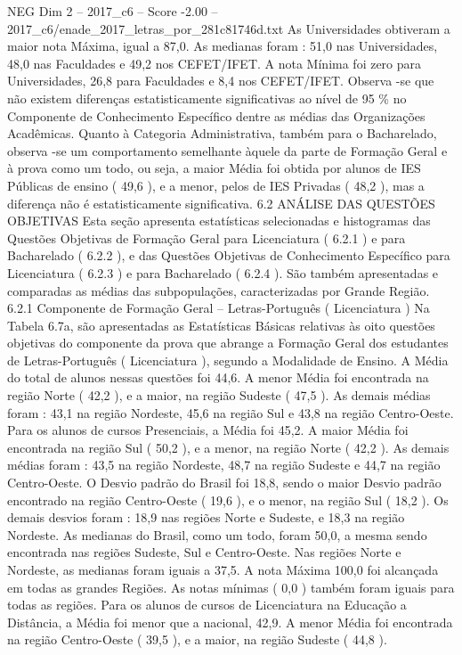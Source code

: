 \begin{textsample}{NEG Dim 2 – 2017\_c6 – Score -2.00 – 2017\_c6/enade\_2017\_letras\_por\_281c81746d.txt}
As Universidades obtiveram a maior nota Máxima, igual a 87,0.
As medianas foram : 51,0 nas Universidades, 48,0 nas Faculdades e 49,2 nos CEFET/IFET.
A nota Mínima foi zero para Universidades, 26,8 para Faculdades e 8,4 nos CEFET/IFET.
Observa -se que não existem diferenças estatisticamente significativas ao nível de 95 \% no Componente de Conhecimento Específico dentre as médias das Organizações Acadêmicas.
Quanto à Categoria Administrativa, também para o Bacharelado, observa -se um comportamento semelhante àquele da parte de Formação Geral e à prova como um todo, ou seja, a maior Média foi obtida por alunos de IES Públicas de ensino ( 49,6 ), e a menor, pelos de IES Privadas ( 48,2 ), mas a diferença não é estatisticamente significativa. 6.2 ANÁLISE DAS QUESTÕES OBJETIVAS Esta seção apresenta estatísticas selecionadas e histogramas das Questões Objetivas de Formação Geral para Licenciatura ( 6.2.1 ) e para Bacharelado ( 6.2.2 ), e das Questões Objetivas de Conhecimento Específico para Licenciatura ( 6.2.3 ) e para Bacharelado ( 6.2.4 ).
São também apresentadas e comparadas as médias das subpopulações, caracterizadas por Grande Região. 6.2.1 Componente de Formação Geral – Letras-Português ( Licenciatura ) Na Tabela 6.7a, são apresentadas as Estatísticas Básicas relativas às oito questões objetivas do componente da prova que abrange a Formação Geral dos estudantes de Letras-Português ( Licenciatura ), segundo a Modalidade de Ensino.
A Média do total de alunos nessas questões foi 44,6.
A menor Média foi encontrada na região Norte ( 42,2 ), e a maior, na região Sudeste ( 47,5 ).
As demais médias foram : 43,1 na região Nordeste, 45,6 na região Sul e 43,8 na região Centro-Oeste.
Para os alunos de cursos Presenciais, a Média foi 45,2.
A maior Média foi encontrada na região Sul ( 50,2 ), e a menor, na região Norte ( 42,2 ).
As demais médias foram : 43,5 na região Nordeste, 48,7 na região Sudeste e 44,7 na região Centro-Oeste.
O Desvio padrão do Brasil foi 18,8, sendo o maior Desvio padrão encontrado na região Centro-Oeste ( 19,6 ), e o menor, na região Sul ( 18,2 ).
Os demais desvios foram : 18,9 nas regiões Norte e Sudeste, e 18,3 na região Nordeste.
As medianas do Brasil, como um todo, foram 50,0, a mesma sendo encontrada nas regiões Sudeste, Sul e Centro-Oeste.
Nas regiões Norte e Nordeste, as medianas foram iguais a 37,5.
A nota Máxima 100,0 foi alcançada em todas as grandes Regiões.
As notas mínimas ( 0,0 ) também foram iguais para todas as regiões.
Para os alunos de cursos de Licenciatura na Educação a Distância, a Média foi menor que a nacional, 42,9.
A menor Média foi encontrada na região Centro-Oeste ( 39,5 ), e a maior, na região Sudeste ( 44,8 ).

\end{textsample}
